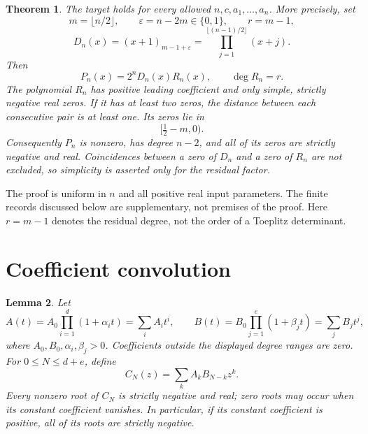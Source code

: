 \documentclass[11pt,a4paper]{article}
\newtheorem{theorem}{Theorem}
\newtheorem{lemma}[theorem]{Lemma}
\begin{document}
\begin{theorem}\label{thm:main} The target holds for every allowed $n,c,a_1,\ldots,a_n$. More precisely, set
\[
 m=\lfloor n/2\rfloor,\qquad \varepsilon=n-2m\in\{0,1\},\qquad r=m-1,
\]
\[
 D_n(x)=(x+1)_{m-1+\varepsilon}
       =\prod_{j=1}^{\lfloor(n-1)/2\rfloor}(x+j).
\]
Then
\[
 P_n(x)=2^nD_n(x)R_n(x),\qquad \deg R_n=r. \tag{2}
\]
The polynomial $R_n$ has positive leading coefficient and only simple, strictly negative real zeros. If it has at least two zeros, the distance between each consecutive pair is at least one. Its zeros lie in
\[
 [\tfrac12-m,0).
\]
Consequently $P_n$ is nonzero, has degree $n-2$, and all of its zeros are strictly negative and real. Coincidences between a zero of $D_n$ and a zero of $R_n$ are not excluded, so simplicity is asserted only for the residual factor.
\end{theorem}

The proof is uniform in \(n\) and all positive real input parameters. The finite records discussed below are supplementary, not premises of the proof. Here \(r=m-1\) denotes the residual degree, not the order of a Toeplitz determinant.

\section{Coefficient convolution}\label{sec:convolution}
\begin{lemma}
Let
\[
 A(t)=A_0\prod_{i=1}^d(1+\alpha_i t)=\sum_i A_i t^i,
 \qquad
 B(t)=B_0\prod_{j=1}^e(1+\beta_j t)=\sum_j B_j t^j,
\]
where $A_0,B_0,\alpha_i,\beta_j>0$. Coefficients outside the displayed degree ranges are zero. For $0\leq N\leq d+e$, define
\[
 C_N(z)=\sum_k A_kB_{N-k}z^k.
\]
Every nonzero root of $C_N$ is strictly negative and real; zero roots may occur when its constant coefficient vanishes. In particular, if its constant coefficient is positive, all of its roots are strictly negative.
\end{lemma}
\end{document}
